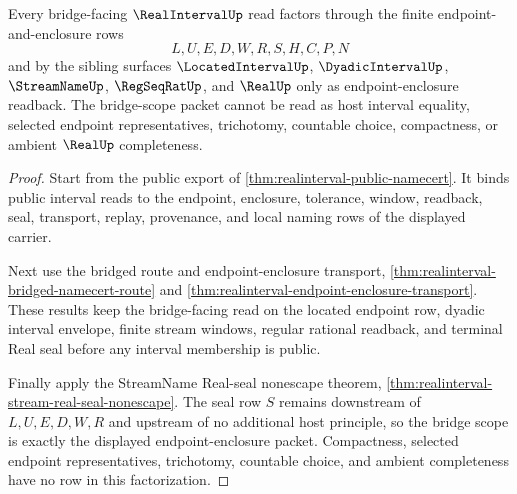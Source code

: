 \begin{theorem}
\label{thm:real-interval-bridge-scope}
Every bridge-facing $\RealIntervalUp$ read factors through the finite endpoint-and-enclosure rows
$$
L,U,E,D,W,R,S,H,C,P,N
$$
and by the sibling surfaces $\LocatedIntervalUp$, $\DyadicIntervalUp$, $\StreamNameUp$, $\RegSeqRatUp$, and $\RealUp$ only as endpoint-enclosure readback. The bridge-scope packet cannot be read as host interval equality, selected endpoint representatives, trichotomy, countable choice, compactness, or ambient $\RealUp$ completeness.
\end{theorem}
\begin{proof}
Start from the public export of \autoref{thm:realinterval-public-namecert}. It binds public interval reads to the endpoint, enclosure, tolerance, window, readback, seal, transport, replay, provenance, and local naming rows of the displayed carrier.

Next use the bridged route and endpoint-enclosure transport, \autoref{thm:realinterval-bridged-namecert-route} and \autoref{thm:realinterval-endpoint-enclosure-transport}. These results keep the bridge-facing read on the located endpoint row, dyadic interval envelope, finite stream windows, regular rational readback, and terminal Real seal before any interval membership is public.

Finally apply the StreamName Real-seal nonescape theorem, \autoref{thm:realinterval-stream-real-seal-nonescape}. The seal row $S$ remains downstream of $L,U,E,D,W,R$ and upstream of no additional host principle, so the bridge scope is exactly the displayed endpoint-enclosure packet. Compactness, selected endpoint representatives, trichotomy, countable choice, and ambient completeness have no row in this factorization.
\end{proof}

